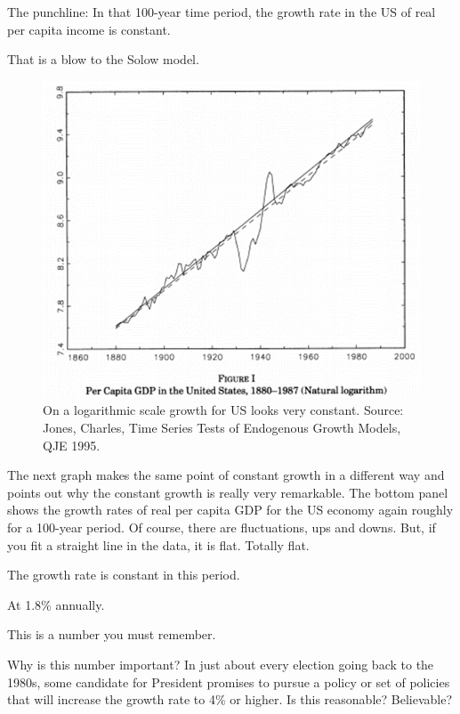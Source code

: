 \documentclass[
]{book}
\begin{document}
The punchline: In that 100-year time period, the growth rate in the US of real per capita income is constant.

That is a blow to the Solow model.

\begin{figure}

{\centering \includegraphics[width=1\linewidth]{img/growth/growth11} 

}

\caption{On a logarithmic scale growth for US looks very constant. Source: Jones, Charles, Time Series Tests of Endogenous Growth Models, QJE 1995.}\label{fig:growth11}
\end{figure}

The next graph makes the same point of constant growth in a different way and points out why the constant growth is really very remarkable.
The bottom panel shows the growth rates of real per capita GDP for the US economy again roughly for a 100-year period. Of course, there are fluctuations, ups and downs. But, if you fit a straight line in the data, it is flat. Totally flat.

The growth rate is constant in this period.

At 1.8\% annually.

This is a number you must remember.

Why is this number important? In just about every election going back to the 1980s, some candidate for President promises to pursue a policy or set of policies that will increase the growth rate to 4\% or higher.
Is this reasonable? Believable?
\end{document}
